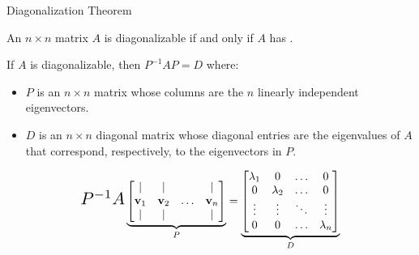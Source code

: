 \documentclass[xcolor=dvipsnames,aspectratio=169,t]{beamer}
\begin{document}
\begin{frame}{Diagonalization Theorem}
  \medskip
  
  \begin{theorem}
  An $n \times n$ matrix $A$ is \alert{diagonalizable} if and only if 
  $A$ has .
  \bigskip
  
  If $A$ is diagonalizable, then $P^{-1}AP=D$ where:
  \begin{itemize}
  \item $P$ is an $n \times n$ matrix whose columns are the $n$ linearly independent eigenvectors.
  \item $D$ is an $n \times n$ diagonal matrix whose diagonal entries are the eigenvalues of $A$ that correspond, respectively, to the eigenvectors in $P$.
  \end{itemize}
\end{theorem}

  \[
    \scalebox{1.5}{$ P^{-1} A $}
    \underbrace{\begin{bmatrix} | & | &  & | \\ \v_1 & \v_2 & \ldots & \v_n \\ | & | & & | \end{bmatrix}}_P
    = 
      \underbrace{
      \begin{bmatrix} 
        \lambda_1 & 0 & \ldots & 0 \\
        0 & \lambda_2 & \ldots & 0 \\
        \vdots & \vdots & \ddots & \vdots \\
        0 & 0 & \ldots & \lambda_n \end{bmatrix}}_D
  \]
\end{frame}
\end{document}
